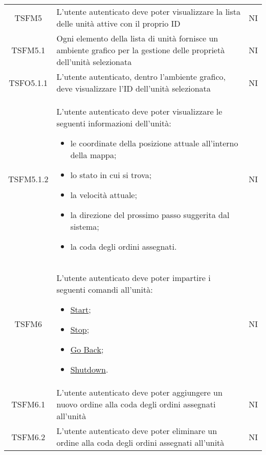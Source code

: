 \begin{longtable}[h!] { c  m{12cm} c}
		TSFM5   & L'utente autenticato deve poter visualizzare la lista delle unità attive con il proprio ID & NI \\

		TSFM5.1 & Ogni elemento della lista di unità fornisce un ambiente grafico per la gestione delle proprietà dell'unità selezionata & NI \\

		TSFO5.1.1 & L'utente autenticato, dentro l'ambiente grafico, deve visualizzare l'ID dell'unità selezionata & NI \\

		TSFM5.1.2 & L'utente autenticato deve poter visualizzare le seguenti informazioni dell'unità:
					\begin{itemize}
						\item le coordinate della posizione attuale all'interno della mappa;
						\item lo stato in cui si trova;
						\item la velocità attuale;
						\item la direzione del prossimo passo suggerita dal sistema;
						\item la coda degli ordini assegnati.
					\end{itemize}
									&NI\\

		TSFM6  & L'utente autenticato deve poter impartire i seguenti comandi all'unità:
					\begin{itemize}
						\item \underline{Start};
						\item \underline{Stop};
						\item \underline{Go Back};
						\item \underline{Shutdown}.
					\end{itemize}
									& NI \\

		TSFM6.1  & L'utente autenticato deve poter aggiungere un nuovo ordine alla coda degli ordini assegnati all'unità & NI\\

		TSFM6.2  & L'utente autenticato deve poter eliminare un ordine alla coda degli ordini assegnati all'unità & NI\\


\end{longtable}
